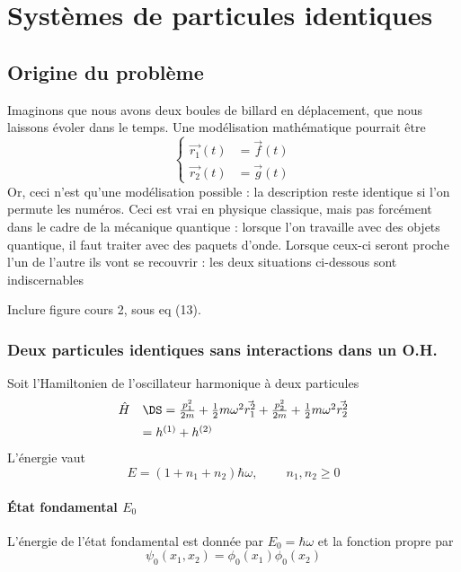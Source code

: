 \chapter{Systèmes de particules identiques}
\section{Origine du problème}
Imaginons que nous avons deux boules de billard en déplacement, que nous laissons évoler dans le temps. 
Une modélisation mathématique pourrait être
\begin{equation}
\left\{\begin{array}{ll}
\vec{r_1}(t) &= \vec{f}(t)\\
\vec{r_2}(t) &= \vec{g}(t)
\end{array}\right.
\end{equation}
Or, ceci n'est qu'une modélisation possible : la description reste identique si l'on permute les numéros. Ceci 
est vrai en physique classique, mais pas forcément dans le cadre de la mécanique quantique : lorsque l'on 
travaille avec des objets quantique, il faut traiter avec des paquets d'onde. Lorsque ceux-ci seront proche l'un 
de l'autre ils vont se recouvrir : les deux situations ci-dessous sont indiscernables
\begin{center}
Inclure figure cours 2, sous eq (13).
\end{center}


\subsection{Deux particules identiques sans interactions dans un O.H.}
Soit l'Hamiltonien de l'oscillateur harmonique à deux particules
\begin{equation}
\begin{array}{ll}
\hat{H} &\DS= \frac{p_1^2}{2m}+\frac{1}{2}m\omega^2\vec{r_1^2}+\frac{p_2^2}{2m}+\frac{1}{2}m\omega^2\vec{r_2^2}\vspace{2mm}\\
&= h^{(1)} + h^{(2)}
\end{array}
\end{equation}
L'énergie vaut 
\begin{equation}
E = (1+n_1+n_2)\hbar\omega,\qquad\ n_1,n_2\geq 0
\end{equation}

\subsubsection{État fondamental $E_0$}
L'énergie de l'état fondamental est donnée par $E_0=\hbar\omega$ et la fonction propre par 
\begin{equation}
\psi_0(x_1,x_2) = \phi_0(x_1)\phi_0(x_2)
\end{equation}

